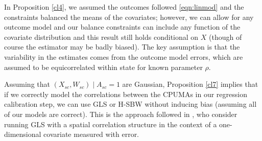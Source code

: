 

\begin{remark}
    In Proposition \ref{cl4}, we assumed the outcomes followed \eqref{eqn:linmod} and the constraints balanced the means of the covariates; however, we can allow for any outcome model and our balance constraints can include any function of the covariate distribution and this result still holds conditional on $X$ (though of course the estimator may be badly biased). The key assumption is that the variability in the estimates comes from the outcome model errors, which are assumed to be equicorrelated within state for known parameter $\rho$.
\end{remark}


\begin{remark}
    Assuming that $(X_{sc}, W_{sc}) \mid A_{sc} = 1$ are Gaussian, Proposition \ref{cl7} implies that if we correctly model the correlations between the CPUMAs in our regression calibration step, we can use GLS or H-SBW without inducing bias (assuming all of our models are correct). This is the approach followed in \cite{huque2014impact}, who consider running GLS with a spatial correlation structure in the context of a one-dimensional covariate measured with error. 
\end{remark}


